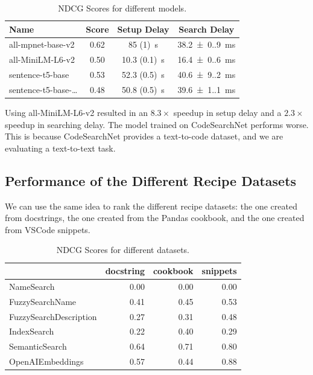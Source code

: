 \documentclass[
     12pt,                    %
     a4paper,             %
     BCOR=10mm,     %
     DIV=14,                 %
     listof=totoc,                    %
     bibliography=totoc,       %
     index=totoc,              %
     twoside,
     headsepline
     ]{scrreprt}
\begin{document}
\begin{table}[htb]
	\centering
	\begin{tabular}{l S S S}
		\toprule
		Name                   & {Score} & {Setup Delay}            & {Search Delay}                \\ \midrule
		all-mpnet-base-v2      & 0.62    & \SI{85 (1)}{\second}     & \SI{38.2(0.9)}{\milli\second} \\
		all-MiniLM-L6-v2       & 0.50    & \SI{10.3 (0.1)}{\second} & \SI{16.4(0.6)}{\milli\second} \\
		sentence-t5-base       & 0.53    & \SI{52.3 (0.5)}{\second} & \SI{40.6(9.2)}{\milli\second} \\
		sentence-t5-base-\dots & 0.48    & \SI{50.8 (0.5)}{\second} & \SI{39.6(1.1)}{\milli\second} \\ \bottomrule
	\end{tabular}
	\caption[NDCG Scores for Different Models]{\label{tab:ndcg_models}NDCG Scores for different models.}
\end{table}

Using all-MiniLM-L6-v2 resulted in an $8.3\times$ speedup in setup delay and a $2.3\times$ speedup in searching delay. The model trained on CodeSearchNet performs worse. This is because CodeSearchNet provides a text-to-code dataset, and we are evaluating a text-to-text task.

\subsection{Performance of the Different Recipe Datasets}

We can use the same idea to rank the different recipe datasets: the one created from docstrings, the one created from the Pandas cookbook, and the one created from VSCode snippets.

\begin{table}[htb]
	\centering
	\begin{tabular}{lrrr}
		\toprule
		                       & docstring & cookbook & snippets \\ \midrule
		NameSearch             &      0.00 &     0.00 &     0.00 \\
		FuzzySearchName        &      0.41 &     0.45 &     0.53 \\
		FuzzySearchDescription &      0.27 &     0.31 &     0.48 \\
		IndexSearch            &      0.22 &     0.40 &     0.29 \\
		SemanticSearch         &      0.64 &     0.71 &     0.80 \\
		OpenAIEmbeddings       &      0.57 &     0.44 &     0.88 \\ \bottomrule
	\end{tabular}
	\caption[NDCG Scores for Different Datasets]{\label{tab:ndcg_datasets}NDCG Scores for different datasets.}
\end{table}
\end{document}

